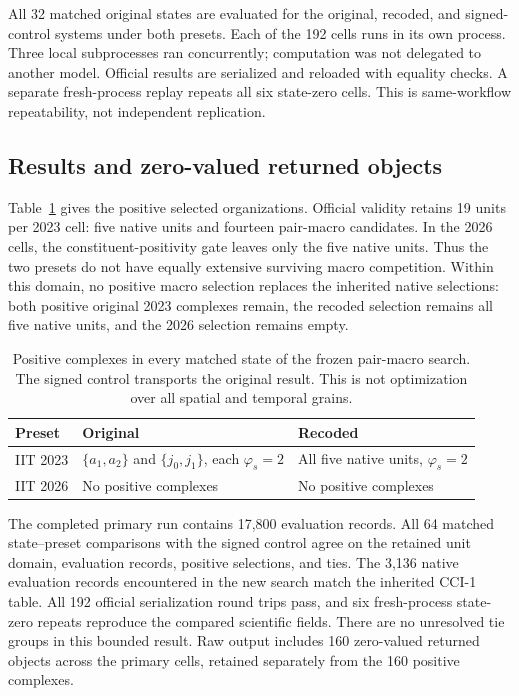 \documentclass[11pt]{article}
\theoremstyle{definition}\newtheorem{definition}[theorem]{Definition}
\theoremstyle{remark}\newtheorem{remark}[theorem]{Remark}
\begin{document}
All 32 matched original states are evaluated for the original, recoded, and signed-control systems under both presets. Each of the 192 cells runs in its own process. Three local subprocesses ran concurrently; computation was not delegated to another model. Official results are serialized and reloaded with equality checks. A separate fresh-process replay repeats all six state-zero cells. This is same-workflow repeatability, not independent replication.

\subsection{Results and zero-valued returned objects}
Table~\ref{tab:grain} gives the positive selected organizations. Official validity retains 19 units per 2023 cell: five native units and fourteen pair-macro candidates. In the 2026 cells, the constituent-positivity gate leaves only the five native units. Thus the two presets do not have equally extensive surviving macro competition. Within this domain, no positive macro selection replaces the inherited native selections: both positive original 2023 complexes remain, the recoded selection remains all five native units, and the 2026 selection remains empty.
\begin{table}[ht]
\centering\small
\caption{Positive complexes in every matched state of the frozen pair-macro search. The signed control transports the original result. This is not optimization over all spatial and temporal grains.}\label{tab:grain}
\begin{tabular}{p{2.0cm}p{4.5cm}p{4.1cm}}\toprule
Preset & Original & Recoded\\\midrule
IIT 2023 & $\{a_1,a_2\}$ and $\{j_0,j_1\}$, each $\varphi_s=2$ & All five native units, $\varphi_s=2$\\
IIT 2026 & No positive complexes & No positive complexes\\\bottomrule
\end{tabular}
\end{table}

The completed primary run contains 17,800 evaluation records. All 64 matched state--preset comparisons with the signed control agree on the retained unit domain, evaluation records, positive selections, and ties. The 3,136 native evaluation records encountered in the new search match the inherited CCI-1 table. All 192 official serialization round trips pass, and six fresh-process state-zero repeats reproduce the compared scientific fields. There are no unresolved tie groups in this bounded result. Raw output includes 160 zero-valued returned objects across the primary cells, retained separately from the 160 positive complexes.
\end{document}
